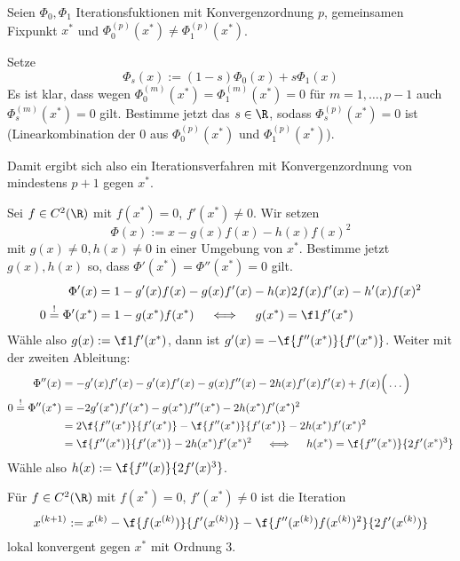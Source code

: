 \documentclass[11pt]{scrartcl}
\begin{document}
\begin{seg}
	Seien $\Phi_0, \Phi_1$ Iterationsfuktionen mit Konvergenzordnung $p$, gemeinsamen Fixpunkt $x^*$ und $\Phi_0^{(p)}(x^*) \neq \Phi_1^{(p)}(x^*)$.

	Setze
	\[
		\Phi_s(x) := (1-s)\Phi_0(x) + s\Phi_1(x)
	\]
	Es ist klar, dass wegen $\Phi_0^{(m)}(x^*) = \Phi_1^{(m)}(x^*) = 0$ für $m=1,\dotsc,p-1$ auch $\Phi_s^{(m)}(x^*) = 0$ gilt.
	Bestimme jetzt das $s\in \R$, sodass $\Phi_s^{(p)}(x^*) = 0$ ist (Linearkombination der $0$ aus $\Phi_0^{(p)}(x^*)$ und $\Phi_1^{(p)}(x^*)$).

	Damit ergibt sich also ein Iterationsverfahren mit Konvergenzordnung von mindestens $p+1$ gegen $x^*$.
\end{seg}
\begin{seg}
	Sei $f\in C^2(\R)$ mit $f(x^*) = 0$, $f'(x^*) \neq 0$.
	Wir setzen
	\[
		\Phi(x) := x - g(x) f(x) - h(x) f(x)^2
	\]
	mit $g(x) \neq 0, h(x) \neq 0$ in einer Umgebung von $x^*$.
	Bestimme jetzt $g(x),h(x)$ so, dass $\Phi'(x^*) = \Phi''(x^*) = 0$ gilt.
	\begin{align*}
		\Phi'(x) &= 1 - g'(x)f(x) - g(x)f'(x) - h(x)2f(x)f'(x) -h'(x)f(x)^2 \\
		0 \stackrel != \Phi'(x^*) &= 1 -g(x^*)f(x^*) \quad\iff\quad g(x^*) = \f 1{f'(x^*)}
	\end{align*}
	Wähle also $g(x) := \f 1{f'(x^*)}$, dann ist $g'(x) = - \f {f''(x^*)}{f'(x^*)}$.
	Weiter mit der zweiten Ableitung:
	\begin{align*}
		\Phi''(x) &= -g'(x)f'(x) -g'(x)f'(x) - g(x)f''(x) - 2h(x)f'(x)f'(x) + f(x)\Big( \dotso \Big) \\
		0 \stackrel != \Phi''(x^*) &= -2g'(x^*)f'(x^*) -g(x^*)f''(x^*) - 2h(x^*)f'(x^*)^2 \\
		&= 2 \f {f''(x^*)}{f'(x^*)} - \f {f''(x^*)}{f'(x^*)} - 2h(x^*) f'(x^*)^2 \\
		&= \f {f''(x^*)}{f'(x^*)} - 2h(x^*) f'(x^*)^2 
		\quad\iff\quad h(x^*) = \f {f''(x^*)}{2f'(x^*)^3}
	\end{align*}
	Wähle also $h(x) := \f {f''(x)}{2f'(x)^3}$.
\end{seg}

\begin{kor} \label{3.13}
	Für $f\in C^2(\R)$ mit $f(x^*)=0$, $f'(x^*) \neq 0$ ist die Iteration
	\[
		x^{(k+1)} := x^{(k)} - \f {f(x^{(k)})}{f'(x^{(k)})} - \f {f''(x^{(k)})f(x^{(k)})^2}{2f'(x^{(k)})}
	\]
	lokal konvergent gegen $x^*$ mit Ordnung $3$.
\end{kor}
\end{document}
